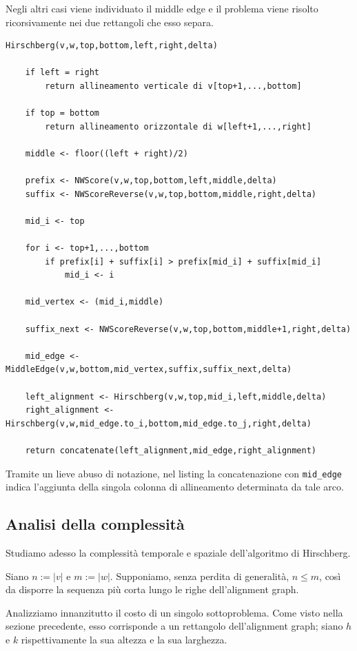 Negli altri casi viene individuato il middle edge e il problema viene risolto ricorsivamente
nei due rettangoli che esso separa.

\begin{lstlisting}[style=pseudo,caption={Algoritmo di Hirschberg}]
Hirschberg(v,w,top,bottom,left,right,delta)
    
    if left = right
        return allineamento verticale di v[top+1,...,bottom]

    if top = bottom
        return allineamento orizzontale di w[left+1,...,right]

    middle <- floor((left + right)/2)

    prefix <- NWScore(v,w,top,bottom,left,middle,delta)
    suffix <- NWScoreReverse(v,w,top,bottom,middle,right,delta)

    mid_i <- top

    for i <- top+1,...,bottom
        if prefix[i] + suffix[i] > prefix[mid_i] + suffix[mid_i]
            mid_i <- i

    mid_vertex <- (mid_i,middle)

    suffix_next <- NWScoreReverse(v,w,top,bottom,middle+1,right,delta)

    mid_edge <- MiddleEdge(v,w,bottom,mid_vertex,suffix,suffix_next,delta)

    left_alignment <- Hirschberg(v,w,top,mid_i,left,middle,delta)
    right_alignment <- Hirschberg(v,w,mid_edge.to_i,bottom,mid_edge.to_j,right,delta)

    return concatenate(left_alignment,mid_edge,right_alignment)
\end{lstlisting}
\label{lst:hirschberg}
Tramite un lieve abuso di notazione, nel listing la concatenazione con \texttt{mid\_edge} indica
l'aggiunta della singola colonna di allineamento determinata da tale arco.

\subsection{Analisi della complessità}

Studiamo adesso la complessità temporale e spaziale dell'algoritmo di Hirschberg.

Siano $n:=|v|$ e $m:=|w|$.
Supponiamo, senza perdita di generalità, $n \leq m$, così da disporre la sequenza più corta
lungo le righe dell'alignment graph.

Analizziamo innanzitutto il costo di un singolo sottoproblema.
Come visto nella sezione precedente, esso corrisponde a un rettangolo dell'alignment graph;
siano $h$ e $k$ rispettivamente la sua altezza e la sua larghezza.

